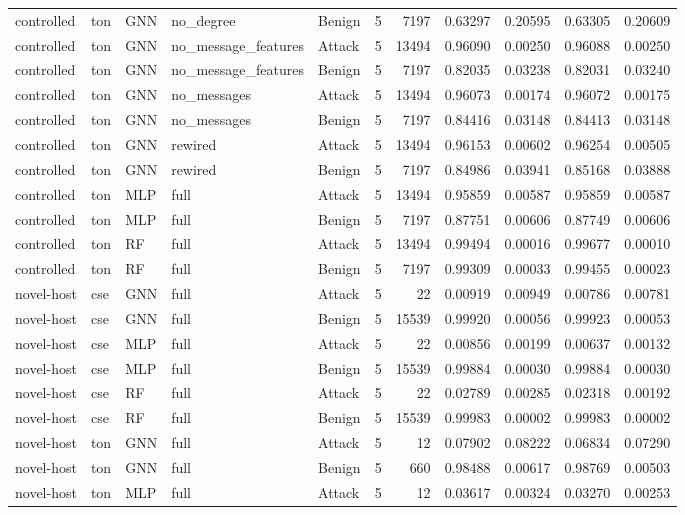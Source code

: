 \begin{tabular}{lllllrrrrrr}
controlled & ton & GNN & no_degree & Benign & 5 & 7197 & 0.63297 & 0.20595 & 0.63305 & 0.20609 \\
controlled & ton & GNN & no_message_features & Attack & 5 & 13494 & 0.96090 & 0.00250 & 0.96088 & 0.00250 \\
controlled & ton & GNN & no_message_features & Benign & 5 & 7197 & 0.82035 & 0.03238 & 0.82031 & 0.03240 \\
controlled & ton & GNN & no_messages & Attack & 5 & 13494 & 0.96073 & 0.00174 & 0.96072 & 0.00175 \\
controlled & ton & GNN & no_messages & Benign & 5 & 7197 & 0.84416 & 0.03148 & 0.84413 & 0.03148 \\
controlled & ton & GNN & rewired & Attack & 5 & 13494 & 0.96153 & 0.00602 & 0.96254 & 0.00505 \\
controlled & ton & GNN & rewired & Benign & 5 & 7197 & 0.84986 & 0.03941 & 0.85168 & 0.03888 \\
controlled & ton & MLP & full & Attack & 5 & 13494 & 0.95859 & 0.00587 & 0.95859 & 0.00587 \\
controlled & ton & MLP & full & Benign & 5 & 7197 & 0.87751 & 0.00606 & 0.87749 & 0.00606 \\
controlled & ton & RF & full & Attack & 5 & 13494 & 0.99494 & 0.00016 & 0.99677 & 0.00010 \\
controlled & ton & RF & full & Benign & 5 & 7197 & 0.99309 & 0.00033 & 0.99455 & 0.00023 \\
novel-host & cse & GNN & full & Attack & 5 & 22 & 0.00919 & 0.00949 & 0.00786 & 0.00781 \\
novel-host & cse & GNN & full & Benign & 5 & 15539 & 0.99920 & 0.00056 & 0.99923 & 0.00053 \\
novel-host & cse & MLP & full & Attack & 5 & 22 & 0.00856 & 0.00199 & 0.00637 & 0.00132 \\
novel-host & cse & MLP & full & Benign & 5 & 15539 & 0.99884 & 0.00030 & 0.99884 & 0.00030 \\
novel-host & cse & RF & full & Attack & 5 & 22 & 0.02789 & 0.00285 & 0.02318 & 0.00192 \\
novel-host & cse & RF & full & Benign & 5 & 15539 & 0.99983 & 0.00002 & 0.99983 & 0.00002 \\
novel-host & ton & GNN & full & Attack & 5 & 12 & 0.07902 & 0.08222 & 0.06834 & 0.07290 \\
novel-host & ton & GNN & full & Benign & 5 & 660 & 0.98488 & 0.00617 & 0.98769 & 0.00503 \\
novel-host & ton & MLP & full & Attack & 5 & 12 & 0.03617 & 0.00324 & 0.03270 & 0.00253 \\

\end{tabular}
